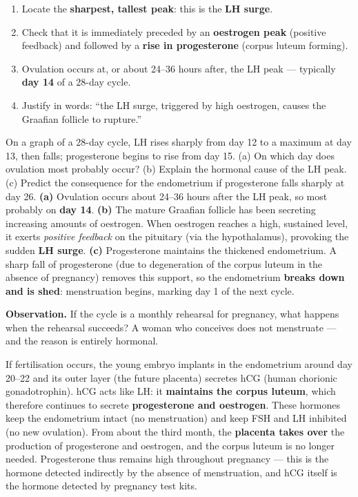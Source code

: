 \documentclass[11pt]{article}
\newcommand{\cle}[1]{{\popxbold\color{popdark}#1}}
\newcounter{popsec}
\newcounter{popsub}
\newcommand{\courssub}[1]{%
  \stepcounter{popsub}%
  \par\vspace{9pt}\noindent{\popxbold\fontsize{11.5}{13}\selectfont\color{popink}{\color{poporange}\thepopsec.\thepopsub}\hspace{6pt}#1}\par\nopagebreak\vspace{4pt}
}
\begin{document}
\begin{methode}
\begin{enumerate}
\item Locate the \textbf{sharpest, tallest peak}: this is the \textbf{LH surge}.
\item Check that it is immediately preceded by an \textbf{oestrogen peak} (positive feedback) and followed by a \textbf{rise in progesterone} (corpus luteum forming).
\item Ovulation occurs at, or about 24--36 hours after, the LH peak --- typically \textbf{day 14} of a 28-day cycle.
\item Justify in words: ``the LH surge, triggered by high oestrogen, causes the Graafian follicle to rupture.''
\end{enumerate}
\end{methode}

\begin{exoresolu}
On a graph of a 28-day cycle, LH rises sharply from day 12 to a maximum at day 13, then falls; progesterone begins to rise from day 15. (a) On which day does ovulation most probably occur? (b) Explain the hormonal cause of the LH peak. (c) Predict the consequence for the endometrium if progesterone falls sharply at day 26.
\tcblower
\textbf{(a)} Ovulation occurs about 24--36 hours after the LH peak, so most probably on \textbf{day 14}.
\textbf{(b)} The mature Graafian follicle has been secreting increasing amounts of oestrogen. When oestrogen reaches a high, sustained level, it exerts \emph{positive feedback} on the pituitary (via the hypothalamus), provoking the sudden \textbf{LH surge}.
\textbf{(c)} Progesterone maintains the thickened endometrium. A sharp fall of progesterone (due to degeneration of the corpus luteum in the absence of pregnancy) removes this support, so the endometrium \textbf{breaks down and is shed}: menstruation begins, marking day 1 of the next cycle.
\end{exoresolu}

\courssub{Hormonal Changes During Pregnancy}

\textbf{Observation.} If the cycle is a monthly rehearsal for pregnancy, what happens when the rehearsal succeeds? A woman who conceives does not menstruate --- and the reason is entirely hormonal.

If fertilisation occurs, the young embryo implants in the endometrium around day 20--22 and its outer layer (the future placenta) secretes \cle{hCG} (human chorionic gonadotrophin). hCG acts like LH: it \textbf{maintains the corpus luteum}, which therefore continues to secrete \textbf{progesterone and oestrogen}. These hormones keep the endometrium intact (no menstruation) and keep FSH and LH inhibited (no new ovulation). From about the third month, the \textbf{placenta takes over} the production of progesterone and oestrogen, and the corpus luteum is no longer needed. Progesterone thus remains high throughout pregnancy --- this is the hormone detected indirectly by the absence of menstruation, and hCG itself is the hormone detected by pregnancy test kits.
\end{document}
